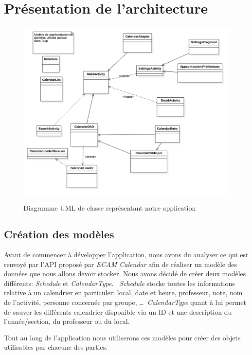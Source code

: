 \documentclass{article}
\begin{document}
	\section{Présentation de l'architecture}
        \begin{figure}
            \centering
            \includegraphics[scale=0.2]{img/uml.png}
            \label{fig:uml}
            \caption{Diagramme UML de classe représentant notre application}
        \end{figure}

	\subsection{Création des modèles}
		Avant de commencer à développer l'application, nous avons du analyser ce qui est renvoyé par
        l'API proposé par \textit{ECAM Calendar}
		afin de réaliser un modèle des données que nous allons devoir stocker. Nous avons décidé de créer deux modèles différents:
        \textit{Schedule} et \textit{CalendarType}. \
        \textit{Schedule} stocke toutes les informations relative à un calendrier en particuler: local, date et heure,
		professeur, note, nom de l'activité, personne concernée par groupe, \ldots \
        \textit{CalendarType} quant à lui permet de sauver les différents calendrier disponible via un ID et une description du l'année/section,
		du professeur ou du local. \

		Tout au long de l'application nous utiliserons ces modèles pour créer des objets utilisables par chacune des parties.
\end{document}
